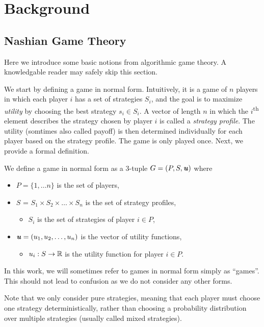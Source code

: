 \chapter{Background}
\section{Nashian Game Theory}
Here we introduce some basic notions from algorithmic game theory.
A knowledgable reader may safely skip this section.

We start by defining a game in normal form.
Intuitively, it is a game of $n$ players in which each player $i$ has a set of strategies $S_i$, and the goal is to maximize \textit{utility} by choosing the best strategy $s_i \in S_i$.
A vector of length $n$ in which the $i$\textsuperscript{th} element describes the strategy chosen by player $i$ is called a \textit{strategy profile}.
The utility (somtimes also called payoff) is then determined individually for each player based on the strategy profile.
The game is only played once.
Next, we provide a formal definition.

\begin{definition}
  We define a game in normal form as a 3-tuple $G = (P, S, \boldsymbol{\mathit{u}})$ where
  \begin{itemize}
    \item $P = \{1, \dots n\}$ is the set of players,
    \item $S$ = $S_1 \times S_2 \times \dots \times S_n$ is the set of strategy profiles,
    \begin{itemize}
      \item $S_i$ is the set of strategies of player $i \in P$,
    \end{itemize}
    \item $\boldsymbol{\mathit{u}} = (u_1, u_2, \dots, u_n)$ is the vector of utility functions,
    \begin{itemize}
      \item $u_i: S \rightarrow \mathbb{R}$ is the utility function for player $i \in P$.
    \end{itemize}
  \end{itemize}
  In this work, we will sometimes refer to games in normal form simply as \enquote{games}.
  This should not lead to confusion as we do not consider any other forms.
\end{definition}

Note that we only consider pure strategies, meaning that each player must choose one strategy deterministically, rather than choosing a probability distribution over multiple strategies (usually called mixed strategies).

